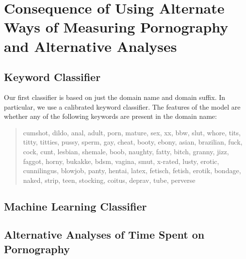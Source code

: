 \documentclass[12pt, letterpaper]{article}
\begin{document}
\section{Consequence of Using Alternate Ways of Measuring Pornography and Alternative Analyses}
\subsection{Keyword Classifier}
Our first classifier is based on just the domain name and domain suffix. In particular, we use a calibrated keyword classifier. The features of the model are whether any of the following keywords are present in the domain name:

\begin{quote}

cumshot, dildo, anal, adult, porn, mature, sex, xx, bbw, slut, whore, tits, titty, titties, pussy, sperm, gay, cheat, booty, ebony, asian, brazilian, fuck, cock, cunt, lesbian, shemale, boob, naughty, fatty, bitch, granny, jizz, faggot, horny, bukakke, bdsm, vagina, smut, x-rated, lusty, erotic, cunnilingus, blowjob, panty, hentai, latex, fetisch, fetish, erotik, bondage, naked, strip, teen, stocking, coitus, deprav, tube, perverse 

\end{quote}
\subsection{Machine Learning Classifier}


\subsection{Alternative Analyses of Time Spent on Pornography}
\end{document}

